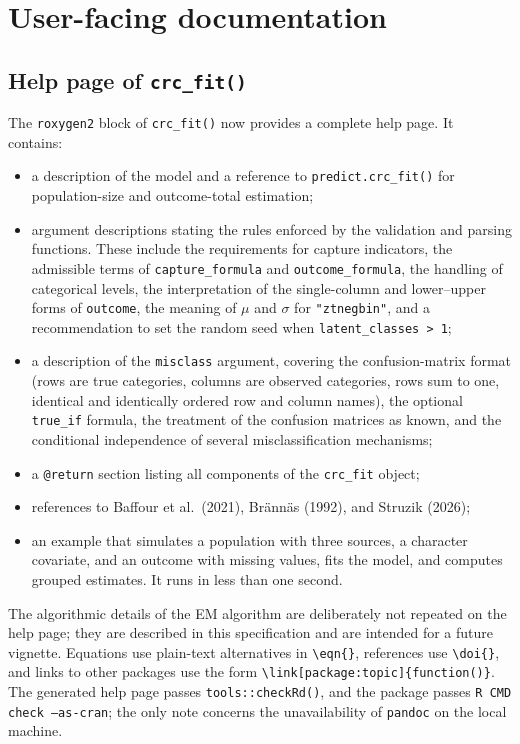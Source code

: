 \documentclass[11pt,letterpaper]{article}
\begin{document}
\section{User-facing documentation}

\subsection{Help page of \texttt{crc\_fit()}}

The \texttt{roxygen2} block of \texttt{crc\_fit()} now provides a complete
help page. It contains:

\begin{itemize}
  \item a description of the model and a reference to
  \texttt{predict.crc\_fit()} for population-size and outcome-total
  estimation;
  \item argument descriptions stating the rules enforced by the validation
  and parsing functions. These include the requirements for capture
  indicators, the admissible terms of \texttt{capture\_formula} and
  \texttt{outcome\_formula}, the handling of categorical levels, the
  interpretation of the single-column and lower--upper forms of
  \texttt{outcome}, the meaning of $\mu$ and $\sigma$ for
  \texttt{"ztnegbin"}, and a recommendation to set the random seed when
  \texttt{latent\_classes > 1};
  \item a description of the \texttt{misclass} argument, covering the
  confusion-matrix format (rows are true categories, columns are observed
  categories, rows sum to one, identical and identically ordered row and
  column names), the optional \texttt{true\_if} formula, the treatment of the
  confusion matrices as known, and the conditional independence of several
  misclassification mechanisms;
  \item a \texttt{@return} section listing all components of the
  \texttt{crc\_fit} object;
  \item references to Baffour et al.\ (2021), Br\"ann\"as (1992), and
  Struzik (2026);
  \item an example that simulates a population with three sources, a
  character covariate, and an outcome with missing values, fits the model,
  and computes grouped estimates. It runs in less than one second.
\end{itemize}

The algorithmic details of the EM algorithm are deliberately not repeated on
the help page; they are described in this specification and are intended for
a future vignette. Equations use plain-text alternatives in
\texttt{\textbackslash eqn\{\}}, references use
\texttt{\textbackslash doi\{\}}, and links to other packages use the form
\texttt{\textbackslash link[package:topic]\{function()\}}. The generated help
page passes \texttt{tools::checkRd()}, and the package passes
\texttt{R CMD check --as-cran}; the only note concerns the unavailability of
\texttt{pandoc} on the local machine.
\end{document}
